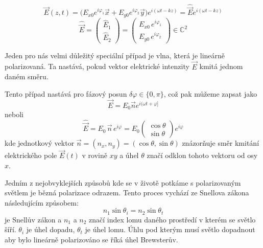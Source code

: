 \documentclass[a4paper]{article}
\numberwithin{equation}{section}
\begin{document}
    \begin{equation}
        \vec{E}(z,t) = \big(E_{x0} e^{i\varphi_1} \vec{x} + E_{y0} e^{i\varphi_2} \vec{y} \big)  e^{i(\omega t - kz)} = \hat{\vec{E}} e^{i(\omega t-kz)}
    \end{equation}
    \begin{equation}
        \hat{\vec{E}} = \begin{pmatrix} \hat{E}_1 \\ \hat{E}_2 \end{pmatrix} = \begin{pmatrix} E_{x0} \, e^{i \varphi_1} \\ E_{y0} \, e^{i \varphi_2} \end{pmatrix}	 \in \mathbb{C}^2
    \end{equation}
    \par Jeden pro nás velmi důležitý speciální případ je vlna, která je lineárně polarizovaná. Ta nastává, pokud vektor elektrické intenzity $\vec{E}$ kmitá jednom daném směru. 
    \par Tento případ nastává pro fázový posun $\delta \varphi \in \{0,\pi\}$, což pak můžeme zapsat jako
    \begin{equation} \label{eq:7}
        \vec{E} = E_0 \vec{n} e^{i(\omega t + \varphi]}
    \end{equation}
    neboli 
    \begin{equation} 
        \hat{\vec{E}} = E_0 \, \vec{n} \, e^{i\varphi} = E_0 \begin{pmatrix} \cos \theta \\ \sin \theta \end{pmatrix} e^{i\varphi}
    \end{equation}
    kde jednotkový vektor $\vec{n} = (n_x,n_y) = (\cos \theta, \sin \theta)$ znázorňuje směr kmitání elektrického pole $\vec{E}(t)$ v rovině $xy$ a úhel $\theta$ značí odklon tohoto vektoru od osy $x$. \cite{schmidt}
    \par Jedním z nejobvyklejších způsobů kde se v životě potkáme s polarizovaným světlem je bězná polarizace odrazem. Tento proces vychází ze Snellova zákona následujícím způsobem: 
    \begin{equation}
        n_1 \sin \theta_i = n_2 \sin \theta_t
    \end{equation}
    je Snellův zákon a $n_1$ a $n_2$ značí index lomu daného prostředí v kterém se světlo šíří.  $\theta_i$ je úhel dopadu, $\theta_t$ je úhel lomu. Úhlu pod kterým musí světlo dopadnout aby bylo lineárně polarizováno se říká úhel Brewsterův. 
\end{document}
